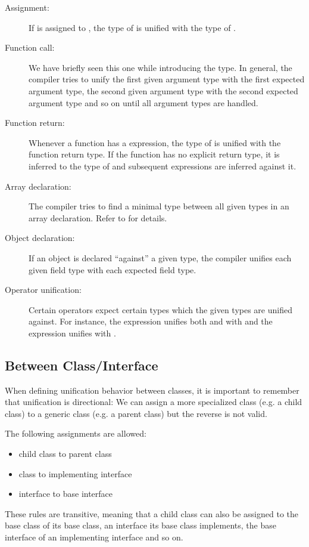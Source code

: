 \begin{description}
	\item[Assignment:] If  is assigned to , the type of  is unified with the type of .
	\item[Function call:] We have briefly seen this one while introducing the  type. In general, the compiler tries to unify the first given argument type with the first expected argument type, the second given argument type with the second expected argument type and so on until all argument types are handled.
	\item[Function return:] Whenever a function has a  expression, the type of  is unified with the function return type. If the function has no explicit return type, it is inferred to the type of  and subsequent  expressions are inferred against it.
	\item[Array declaration:] The compiler tries to find a minimal type between all given types in an array declaration. Refer to  for details.
	\item[Object declaration:] If an object is declared ``against'' a given type, the compiler unifies each given field type with each expected field type.
	\item[Operator unification:] Certain operators expect certain types which the given types are unified against. For instance, the expression  unifies both  and  with  and the expression  unifies  with .
\end{description}


\subsection{Between Class/Interface}
\label{type-system-unification-between-classes-and-interfaces}

When defining unification behavior between classes, it is important to remember that unification is directional: We can assign a more specialized class (e.g. a child class) to a generic class (e.g. a parent class) but the reverse is not valid.

The following assignments are allowed:

\begin{itemize}
	\item child class to parent class
	\item class to implementing interface
	\item interface to base interface
\end{itemize}
These rules are transitive, meaning that a child class can also be assigned to the base class of its base class, an interface its base class implements, the base interface of an implementing interface and so on.

